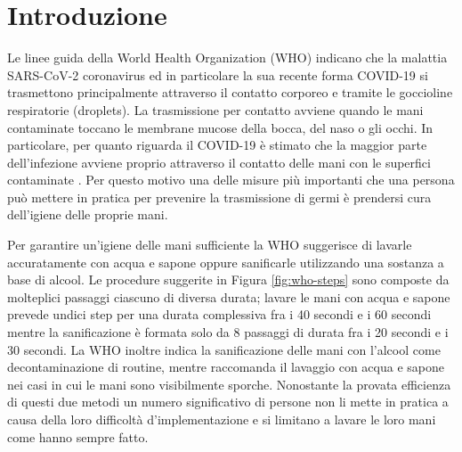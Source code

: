 \chapter{Introduzione}
\label{cap:introduzione}

Le linee guida della World Health Organization (WHO) indicano che la malattia SARS-CoV-2 coronavirus ed in particolare la sua recente forma COVID-19 si trasmettono principalmente attraverso il contatto corporeo e tramite le goccioline respiratorie (droplets). La trasmissione per contatto avviene quando le mani contaminate toccano le membrane mucose della bocca, del naso o gli occhi. In particolare, per quanto riguarda il COVID-19 è stimato che la maggior parte dell'infezione avviene proprio attraverso il contatto delle mani con le superfici contaminate \cite{santarpia2020aerosol}. Per questo motivo una delle misure più importanti che una persona può mettere in pratica per prevenire la trasmissione di germi è prendersi cura dell'igiene delle proprie mani.

Per garantire un'igiene delle mani sufficiente la WHO suggerisce di lavarle accuratamente con acqua e sapone oppure sanificarle utilizzando una sostanza a base di alcool.
Le procedure suggerite in Figura \ref{fig:who-steps} sono composte da molteplici passaggi ciascuno di diversa durata; lavare le mani con acqua e sapone prevede undici step per una durata complessiva fra 
i 40 secondi e i 60 secondi mentre la sanificazione è formata solo da 8 passaggi di durata fra i 20 secondi e i 30 secondi. 
La WHO inoltre indica la sanificazione delle mani con l'alcool come decontaminazione di routine, mentre raccomanda il lavaggio con acqua e sapone nei casi in cui le mani sono visibilmente sporche.
Nonostante la provata efficienza di questi due metodi un numero significativo di persone non li mette in pratica a causa della loro difficoltà d'implementazione e si limitano a lavare le loro mani come hanno sempre fatto.

